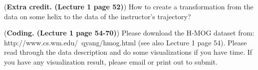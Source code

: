 \documentclass[12pt,letterpaper]{hmcpset}
\begin{document}
\begin{problem}[4]
	(\textbf{Extra credit. (Lecture 1 page 52)}) How to create a transformation from the data on some helix to the data of the instructor’s trajectory?


\end{problem}
\begin{solution}
	\vfill
\end{solution}
\newpage


\begin{problem}[5]
	(\textbf{Coding. (Lecture 1 page 54-70)}) Please download the H-MOG dataset from: http://www.cs.wm.edu/~qyang/hmog.html (see also Lecture 1 page 54).
	 Please read through the data description and do some visualizations if you have time. If you have any visualization result, please email or print out to submit.


\end{problem}
\begin{solution}
	\vfill
\end{solution}
\newpage
\end{document}

